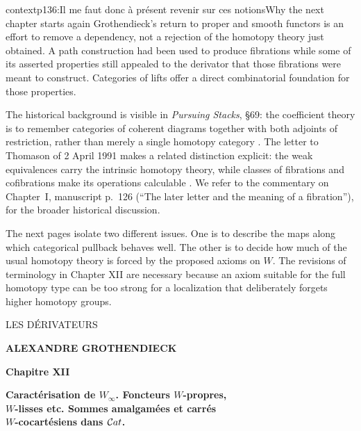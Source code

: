 \begin{dcomment}{context}{p136:Il me faut donc à présent revenir sur ces notions}{Why the next chapter starts again}
Grothendieck's return to proper and smooth functors is an effort to remove a dependency, not a rejection of the homotopy theory just obtained. A path construction had been used to produce fibrations while some of its asserted properties still appealed to the derivator that those fibrations were meant to construct. Categories of lifts offer a direct combinatorial foundation for those properties.

The historical background is visible in \emph{Pursuing Stacks}, \S69: the coefficient theory is to remember categories of coherent diagrams together with both adjoints of restriction, rather than merely a single homotopy category \citep{Grothendieck1983}. The letter to Thomason of 2 April 1991 makes a related distinction explicit: the weak equivalences carry the intrinsic homotopy theory, while classes of fibrations and cofibrations make its operations calculable \citep[\S1]{Grothendieck1991Letter}. We refer to the commentary on Chapter~I, manuscript p.~126 (“The later letter and the meaning of a fibration”), for the broader historical discussion.

The next pages isolate two different issues. One is to describe the maps along which categorical pullback behaves well. The other is to decide how much of the usual homotopy theory is forced by the proposed axioms on \(W\). The revisions of terminology in Chapter XII are necessary because an axiom suitable for the full homotopy type can be too strong for a localization that deliberately forgets higher homotopy groups.
\end{dcomment}
\printedpage{--}

\begin{center}
{\Large \textsf{LES DÉRIVATEURS}}

\bigskip

\textbf{ALEXANDRE GROTHENDIECK}

\bigskip\bigskip

\textbf{Chapitre XII}

\medskip

\textbf{Caractérisation de $W_\infty$. Foncteurs $W$-propres,\\
$W$-lisses etc. Sommes amalgamées et carrés\\
$W$-cocartésiens dans $\mathcal{C}at$.}
\end{center}

